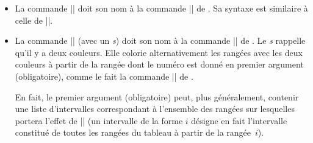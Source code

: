 \documentclass[dvipsnames]{article}%
\begin{document}
\begin{itemize}
\begin{scope}
\hfuzz=10cm
\begin{BVerbatim}[boxwidth=9cm,baseline=c]
$\begin{NiceArray}{lll}[hvlines]
\CodeBefore
  ~emphase#\rowcolor{red!15}{1,3-5,8-}@
\Body
a_1 & b_1 & c_1 \\
a_2 & b_2 & c_2 \\
a_3 & b_3 & c_3 \\
a_4 & b_4 & c_4 \\
a_5 & b_5 & c_5 \\
a_6 & b_6 & c_6 \\
a_7 & b_7 & c_7 \\
a_8 & b_8 & c_8 \\
a_9 & b_9 & c_9 \\
a_{10} & b_{10} & c_{10} \\
\end{NiceArray}$
\end{BVerbatim}
%
$\begin{NiceArray}{lll}[baseline=4,hvlines]
\CodeBefore
  \rowcolor{red!15}{1,3-5,8-}
\Body
a_1 & b_1 & c_1 \\
a_2 & b_2 & c_2 \\
a_3 & b_3 & c_3 \\
a_4 & b_4 & c_4 \\
a_5 & b_5 & c_5 \\
a_6 & b_6 & c_6 \\
a_7 & b_7 & c_7 \\
a_8 & b_8 & c_8 \\
a_9 & b_9 & c_9 \\
a_{10} & b_{10} & c_{10} \\
\end{NiceArray}$
\end{scope}



\medskip
\item La commande |\columncolor| doit son nom à la commande |\columncolor| de
. Sa syntaxe est similaire à celle de |\rowcolor|.

\medskip
\item La commande |\rowcolors| (avec un \emph{s}) doit son nom à la commande
|\rowcolors| de . Le \emph{s} rappelle
qu'il y a deux couleurs. Elle colorie alternativement les rangées avec les deux
couleurs à partir de la rangée dont le numéro est donné en premier argument
(obligatoire), comme le fait la commande |\rowcolors| de .

En fait, le premier argument (obligatoire) peut, plus généralement, contenir
une liste d'intervalles correspondant à l'ensemble des rangées sur lesquelles
portera l'effet de |\rowcolors| (un intervalle de la forme $i$ désigne en fait
l'intervalle constitué de toutes les rangées du tableau à partir de la rangée~$i$).



\end{itemize}
\end{document}
